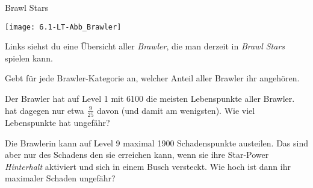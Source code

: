 \documentclass[12pt,a5paper,landscape]{scrartcl}
\begin{document}
	\begin{karte3}[\symPartner]{Brawl Stars}
		\begin{minipage}{.5\textwidth}
			\texttt{[image: 6.1-LT-Abb\_Brawler]}
		\end{minipage}\hfill\begin{minipage}{.49\textwidth}
			Links siehst du eine Übersicht aller \emph{Brawler}, die man derzeit in \emph{Brawl Stars} spielen kann.
			
			\begin{smallenumerate}\small
				\item Gebt für jede Brawler-Kategorie an, welcher Anteil aller Brawler ihr angehören.
				
				\item Der Brawler  hat auf Level 1 mit \num{6100} die meisten Lebenspunkte aller Brawler.  hat dagegen nur etwa $\tfrac{9}{25}$ davon (und damit am wenigsten). Wie viel Lebenspunkte hat  ungefähr?
				
				\item Die Brawlerin  kann auf Level 9 maximal \num{1900} Schadenspunkte austeilen. Das sind aber nur  des Schadens den sie erreichen kann, wenn sie ihre Star-Power \emph{Hinterhalt} aktiviert und sich in einem Busch versteckt. Wie hoch ist dann ihr maximaler Schaden ungefähr?
			\end{smallenumerate}
		\end{minipage}
	\end{karte3}
	
\end{document}
